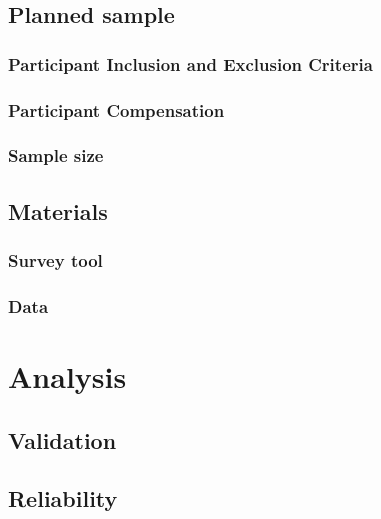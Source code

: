 \subsection{Planned sample}
\subsubsection{Participant Inclusion and Exclusion Criteria}
\subsubsection{Participant Compensation}
\subsubsection{Sample size}

\subsection{Materials}
\subsubsection{Survey tool}
\subsubsection{Data}

\section{Analysis}
\subsection{Validation}
\subsection{Reliability}


